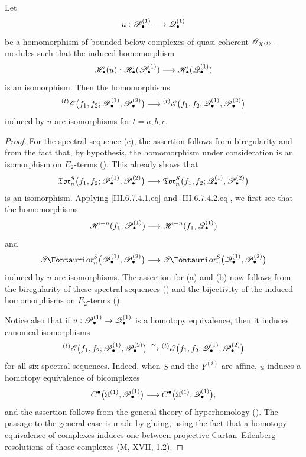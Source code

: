 \begin{proposition}[6.7.5]
\label{III.6.7.5}
Let
\[
  u:\mathscr{P}_\bullet^{(1)}
  \longrightarrow
  \mathscr{Q}_\bullet^{(1)}
\]
be a homomorphism of bounded-below complexes of quasi-coherent
$\mathscr{O}_{X^{(1)}}$-modules such that the induced homomorphism
\[
  \mathscr{H}_\bullet(u):
  \mathscr{H}_\bullet(\mathscr{P}_\bullet^{(1)})
  \longrightarrow
  \mathscr{H}_\bullet(\mathscr{Q}_\bullet^{(1)})
\]
is an isomorphism.  Then the homomorphisms
\[
  {}^{(t)}\mathscr{E}
  \bigl(
    f_1,f_2;
    \mathscr{P}_\bullet^{(1)},\mathscr{P}_\bullet^{(2)}
  \bigr)
  \longrightarrow
  {}^{(t)}\mathscr{E}
  \bigl(
    f_1,f_2;
    \mathscr{Q}_\bullet^{(1)},\mathscr{P}_\bullet^{(2)}
  \bigr)
\]
induced by $u$ are isomorphisms for $t=a,b,c$.
\end{proposition}

\begin{proof}
For the spectral sequence \textnormal{(c)}, the assertion follows
from biregularity and from the fact that, by hypothesis, the
homomorphism under consideration is an isomorphism on
$E_2$-terms ().  This already shows that
\[
\begin{split}
  \mathfrak{Tor}_n^S
  \bigl(
    f_1,f_2;
    \mathscr{P}_\bullet^{(1)},\mathscr{P}_\bullet^{(2)}
  \bigr)
  \longrightarrow
  \mathfrak{Tor}_n^S
  \bigl(
    f_1,f_2;
    \mathscr{Q}_\bullet^{(1)},\mathscr{P}_\bullet^{(2)}
  \bigr)
\end{split}
\]
is an isomorphism.  Applying \eqref{III.6.7.4.1.eq} and
\eqref{III.6.7.4.2.eq}, we first see that the homomorphisms
\[
  \mathscr{H}^{-n}(f_1,\mathscr{P}_\bullet^{(1)})
  \longrightarrow
  \mathscr{H}^{-n}(f_1,\mathscr{Q}_\bullet^{(1)})
\]
and
\[
  \shTor_n^S
  \bigl(
    \sh P_\bullet^{(1)},\sh P_\bullet^{(2)}
  \bigr)
  \longrightarrow
  \shTor_n^S
  \bigl(
    \sh Q_\bullet^{(1)},\sh P_\bullet^{(2)}
  \bigr)
\]
induced by $u$ are isomorphisms.  The assertion for
\textnormal{(a)} and \textnormal{(b)} now follows from the
biregularity of these spectral sequences
() and the bijectivity of the induced
homomorphisms on $E_2$-terms ().

Notice also that if
$u:\mathscr{P}_\bullet^{(1)}\to\mathscr{Q}_\bullet^{(1)}$ is a homotopy
equivalence, then it induces canonical isomorphisms
\[
  {}^{(t)}\mathscr{E}
  \bigl(
    f_1,f_2;
    \mathscr{P}_\bullet^{(1)},\mathscr{P}_\bullet^{(2)}
  \bigr)
  \xrightarrow{\sim}
  {}^{(t)}\mathscr{E}
  \bigl(
    f_1,f_2;
    \mathscr{Q}_\bullet^{(1)},\mathscr{P}_\bullet^{(2)}
  \bigr)
\]
for all six spectral sequences.  Indeed, when $S$ and the
$Y^{(i)}$ are affine, $u$ induces a homotopy equivalence of
bicomplexes
\[
  C^\bullet
  \bigl(
    \mathfrak U^{(1)},\mathscr{P}_\bullet^{(1)}
  \bigr)
  \longrightarrow
  C^\bullet
  \bigl(
    \mathfrak U^{(1)},\mathscr{Q}_\bullet^{(1)}
  \bigr),
\]
and the assertion follows from the general theory of
hyperhomology ().  The passage to the general
case is made by gluing, using the fact that a homotopy
equivalence of complexes induces one between projective
Cartan--Eilenberg resolutions of those complexes
(\textnormal{M}, XVII, 1.2).
\end{proof}

